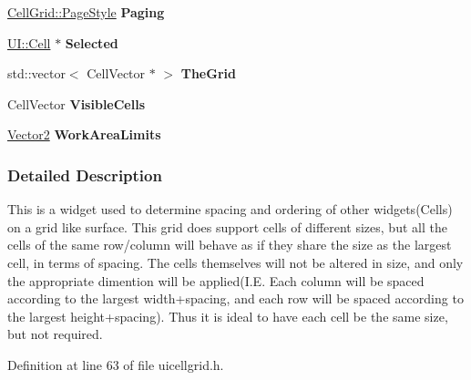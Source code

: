 \begin{DoxyCompactItemize}
\item 
\hypertarget{classMezzanine_1_1UI_1_1CellGrid_aff58a999c5584ea3ac6b36e77133a295}{
\hyperlink{classMezzanine_1_1UI_1_1CellGrid_a6e1e734ffd3425d16a1d86893e362f5e}{CellGrid::PageStyle} {\bfseries Paging}}
\label{classMezzanine_1_1UI_1_1CellGrid_aff58a999c5584ea3ac6b36e77133a295}

\item 
\hypertarget{classMezzanine_1_1UI_1_1CellGrid_a143c718a254713b1fd2ee42d5396d3cf}{
\hyperlink{classMezzanine_1_1UI_1_1Cell}{UI::Cell} $\ast$ {\bfseries Selected}}
\label{classMezzanine_1_1UI_1_1CellGrid_a143c718a254713b1fd2ee42d5396d3cf}

\item 
\hypertarget{classMezzanine_1_1UI_1_1CellGrid_aeac02021fe4dab087f7f4ee793b67efa}{
std::vector$<$ CellVector $\ast$ $>$ {\bfseries TheGrid}}
\label{classMezzanine_1_1UI_1_1CellGrid_aeac02021fe4dab087f7f4ee793b67efa}

\item 
\hypertarget{classMezzanine_1_1UI_1_1CellGrid_a6047973c97d0d9c9be3aa0d7acb6d4f9}{
CellVector {\bfseries VisibleCells}}
\label{classMezzanine_1_1UI_1_1CellGrid_a6047973c97d0d9c9be3aa0d7acb6d4f9}

\item 
\hypertarget{classMezzanine_1_1UI_1_1CellGrid_a11892c8fb854bcc546484c82bde88633}{
\hyperlink{classMezzanine_1_1Vector2}{Vector2} {\bfseries WorkAreaLimits}}
\label{classMezzanine_1_1UI_1_1CellGrid_a11892c8fb854bcc546484c82bde88633}

\end{DoxyCompactItemize}


\subsubsection{Detailed Description}
This is a widget used to determine spacing and ordering of other widgets(Cells) on a grid like surface. This grid does support cells of different sizes, but all the cells of the same row/column will behave as if they share the size as the largest cell, in terms of spacing. The cells themselves will not be altered in size, and only the appropriate dimention will be applied(I.E. Each column will be spaced according to the largest width+spacing, and each row will be spaced according to the largest height+spacing). Thus it is ideal to have each cell be the same size, but not required. 

Definition at line 63 of file uicellgrid.h.



